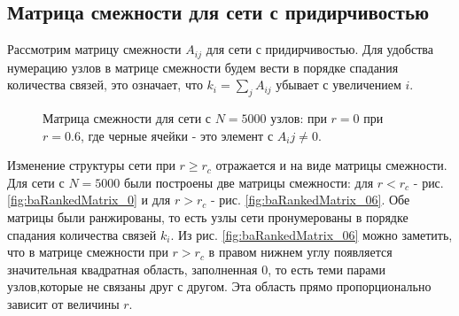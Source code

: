 \documentclass[10pt,aps,pra]{revtex4-1}
\begin{document}
    \subsection{Матрица смежности для сети с придирчивостью}

        Рассмотрим матрицу смежности $A_{ij}$ для сети с придирчивостью. Для удобства нумерацию узлов в матрице смежности будем вести в порядке спадания количества связей, это означает, что $k_i=\sum\limits_{j}A_{ij}$ убывает с увеличением $i$.

            \begin{figure}[H]  
                \centering

                \caption{
                    \label{fig:baRankedMatrix}
                    Матрица смежности для сети с $N=5000$ узлов:
                      при $r=0$
                     при $r=0.6$, где черные ячейки - это элемент с $A_ij \neq 0$.
                }
            \end{figure}

        Изменение структуры сети при $r \geq r_c$ отражается и на виде матрицы смежности. Для сети с $N=5000$ были построены две матрицы смежности: для $r<r_c$ - рис. \ref{fig:baRankedMatrix_0} и для $r>r_c$ - рис. \ref{fig:baRankedMatrix_06}. Обе матрицы были ранжированы, то есть узлы сети пронумерованы в порядке спадания количества связей $k_i$. Из рис. \ref{fig:baRankedMatrix_06} можно заметить, что в матрице смежности при $r>r_c$ в правом нижнем углу появляется значительная квадратная область, заполненная 0, то есть теми парами узлов,которые не связаны друг с другом. Эта область прямо пропорционально зависит от величины $r$.
\end{document}
